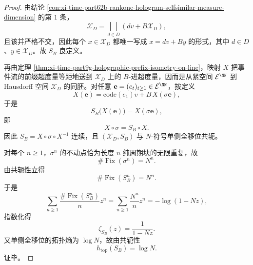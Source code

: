 \begin{proof}
由结论 \ref{con:xi-time-part62b-rankone-hologram-selfsimilar-measure-dimension} 的第 \(1\) 条，
\[
\mathcal X_D=\bigsqcup_{d\in D}(dv+B\mathcal X_D),
\]
且该并严格不交，因此每个 \(x\in\mathcal X_D\) 都唯一写成 \(x=dv+By\) 的形式，其中 \(d\in D\)、\(y\in\mathcal X_D\)。故 \(S_B\) 良定义。

再由定理 \ref{thm:xi-time-part9g-holographic-prefix-isometry-on-line}，映射 \(X\) 把事件流的前缀超度量等距地送到 \(\mathcal X_D\) 上的 \(B\)-进超度量，因而是从紧空间 \(\mathcal E^{\NN}\) 到 Hausdorff 空间 \(\mathcal X_D\) 的同胚。对任意 \(\mathbf e=(e_t)_{t\ge 1}\in\mathcal E^{\NN}\)，按定义
\[
X(\mathbf e)=\mathrm{code}(e_1)v+B\,X(\sigma\mathbf e),
\]
于是
\[
S_B\bigl(X(\mathbf e)\bigr)=X(\sigma\mathbf e),
\]
即
\[
X\circ \sigma=S_B\circ X.
\]
因此 \(S_B=X\circ \sigma\circ X^{-1}\) 连续，且 \((\mathcal X_D,S_B)\) 与 \(N\)-符号单侧全移位共轭。

对每个 \(n\ge 1\)，\(\sigma^n\) 的不动点恰为长度 \(n\) 纯周期块的无限重复，故
\[
\#\operatorname{Fix}(\sigma^n)=N^n.
\]
由共轭性立得
\[
\#\operatorname{Fix}(S_B^n)=N^n.
\]
于是
\[
\sum_{n\ge 1}\frac{\#\operatorname{Fix}(S_B^n)}{n}z^n
=
\sum_{n\ge 1}\frac{N^n}{n}z^n
=
-\log(1-Nz),
\]
指数化得
\[
\zeta_{S_B}(z)=\frac{1}{1-Nz}.
\]
又单侧全移位的拓扑熵为 \(\log N\)，故由共轭性
\[
h_{\mathrm{top}}(S_B)=\log N.
\]
证毕。
\end{proof}


